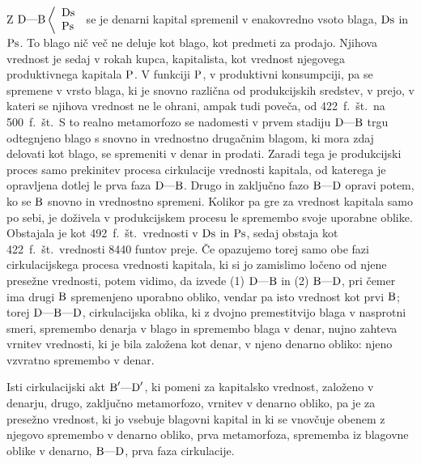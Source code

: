 \documentclass[kapital_02.tex]{subfiles}
\begin{document}
Z \( 
    \textrm{D}\textrm{---}\textrm{B}\left< 
    \begin{array}{l}
        \textrm{Ds}\\
        \textrm{Ps}\\
    \end{array}
    \right. 
\) se je denarni kapital spremenil v enakovredno vsoto blaga, \( \textrm{Ds} \) in \( \textrm{Ps} \). To blago nič več ne deluje kot blago, kot predmeti za prodajo. Njihova vrednost je sedaj v rokah kupca, kapitalista, kot vrednost njegovega produktivnega kapitala \( \textrm{P} \). V funkciji \( \textrm{P} \), v produktivni konsumpciji, pa se spremene v vrsto blaga, ki je snovno različna od produkcijskih sredstev, v prejo, v kateri se njihova vrednost ne le ohrani, ampak tudi poveča, od 422~f.~št.\ na 500~f.~št.\ S to realno metamorfozo se nadomesti v prvem stadiju \( \textrm{D}\textrm{---}\textrm{B} \) trgu odtegnjeno blago s snovno in vrednostno drugačnim blagom, ki mora zdaj delovati kot blago, se spremeniti v denar in prodati. Zaradi tega je produkcijski proces samo prekinitev procesa cirkulacije vrednosti kapitala, od katerega je opravljena dotlej le prva faza \( \textrm{D}\textrm{---}\textrm{B} \). Drugo in zaključno fazo \( \textrm{B}\textrm{---}\textrm{D} \) opravi potem, ko se \( \textrm{B} \) snovno in vrednostno spremeni. Kolikor pa gre za vrednost kapitala samo po sebi, je doživela v produkcijskem procesu le spremembo svoje uporabne oblike. Obstajala je kot 492~f.~št.\ vrednosti v \( \textrm{Ds} \) in \( \textrm{Ps} \), sedaj obstaja kot 422~f.~št.\ vrednosti 8440 funtov preje. Če opazujemo torej samo obe fazi cirkulacijskega procesa vrednosti kapitala, ki si jo zamislimo ločeno od njene presežne vrednosti, potem vidimo, da izvede (1) \( \textrm{D}\textrm{---}\textrm{B} \) in (2) \( \textrm{B}\textrm{---}\textrm{D} \), pri čemer ima drugi \( \textrm{B} \) spremenjeno uporabno obliko, vendar pa isto vrednost kot prvi \( \textrm{B} \); torej \( \textrm{D}\textrm{---}\textrm{B}\textrm{---}\textrm{D} \), cirkulacijska oblika, ki z dvojno premestitvijo blaga v nasprotni smeri, spremembo denarja v blago in spremembo blaga v denar, nujno zahteva vrnitev vrednosti, ki je bila založena kot denar, v njeno denarno obliko: njeno vzvratno spremembo v denar.

Isti cirkulacijski akt \( \textrm{B}'\textrm{---}\textrm{D}' \), ki pomeni za kapitalsko vrednost, založeno v denarju, drugo, zaključno metamorfozo, vrnitev v denarno obliko, pa je za presežno vrednost, ki jo vsebuje blagovni kapital in ki se vnovčuje obenem z njegovo spremembo v denarno obliko, prva metamorfoza, sprememba iz blagovne oblike v denarno, \( \textrm{B}\textrm{---}\textrm{D} \), prva faza cirkulacije.
\end{document}

